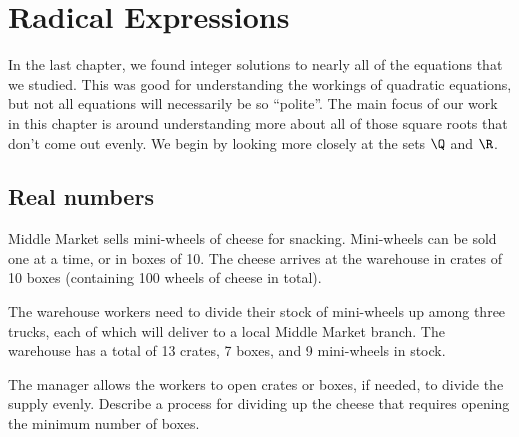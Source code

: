 \chapter{Radical Expressions}
\label{ch:radicals}

\newcommand*\rfrac[2]{{}^{#1}\!/_{#2}}



In the last chapter, we found integer solutions to nearly all of the equations that we studied. This was good for understanding the workings of quadratic equations, but not all equations will necessarily be so ``polite''. The main focus of our work in this chapter is around understanding more about all of those square roots that don't come out evenly. We begin by looking more closely at the sets $\Q$ and $\R$.

\section{Real numbers}
\label{sec:radrealnumbers}

\begin{boxedexplore}
Middle Market sells mini-wheels of cheese for snacking. Mini-wheels can be sold one at a time, or in boxes of 10. The cheese arrives at the warehouse in crates of 10 boxes (containing 100 wheels of cheese in total).

The warehouse workers need to divide their stock of mini-wheels up among three trucks, each of which will deliver to a local Middle Market branch. The warehouse has a total of 13 crates, 7 boxes, and 9 mini-wheels in stock.

The manager allows the workers to open crates or boxes, if needed, to divide the supply evenly. Describe a process for dividing up the cheese that requires opening the minimum number of boxes.
\end{boxedexplore}

